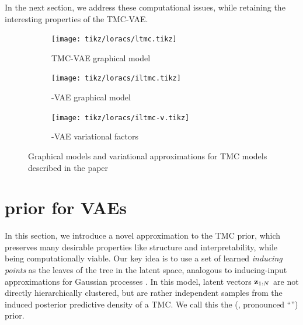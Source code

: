 In the next section, we address these computational
issues, while retaining
the interesting properties of the TMC-VAE.

\begin{figure}[t]
\centering
\begin{subfigure}[t]{0.3\textwidth}
    \centering
    \texttt{[image: tikz/loracs/ltmc.tikz]}
    \caption{TMC-VAE graphical model}
\end{subfigure}
\begin{subfigure}[t]{0.34\textwidth}
    \centering
    \texttt{[image: tikz/loracs/iltmc.tikz]}
    \caption{\acronym-VAE graphical model}
\end{subfigure}
\begin{subfigure}[t]{0.34\textwidth}
    \centering
    \texttt{[image: tikz/loracs/iltmc-v.tikz]}
    \caption{\acronym-VAE variational factors}
\end{subfigure}
\caption{Graphical models and variational
approximations for TMC models described in the paper}
\label{fig:graphical-models}
\end{figure}

\section{\acronym\;prior for VAEs}

In this section, we introduce
a novel approximation to the TMC
prior, which preserves many 
desirable properties
like structure and interpretability,
while being computationally viable.
Our key idea is to use a set of
learned \emph{inducing points}
as the leaves of the tree in the latent
space, analogous to inducing-input
approximations for Gaussian processes \citep{Snelson2006}. 
In this model, latent vectors $\mathbf{z}_{1:N}$
are not directly hierarchically clustered,
but are rather independent samples
from the induced posterior predictive density
of a TMC.
We call this the \acronymexplanation\;(\emph{\acronym}, pronounced ``\acronympronunciation'') prior.

